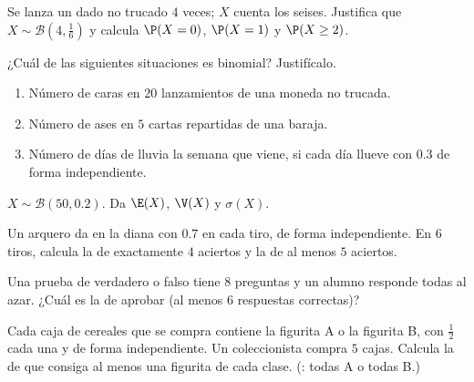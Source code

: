 \begin{exercise}[$\star$]\label{exo:g11:binom:2}
Se lanza un dado no trucado $4$ veces; $X$ cuenta los seises. Justifica
que $X \sim \mathcal B\left(4, \frac16\right)$ y calcula $\P(X = 0)$,
$\P(X = 1)$ y $\P(X \geq 2)$.
\end{exercise}

\begin{exercise}[$\star$]\label{exo:g11:binom:3}
¿Cuál de las siguientes situaciones es binomial? Justifícalo.
\begin{enumerate}
  \item Número de caras en $20$ lanzamientos de una moneda no trucada.
  \item Número de ases en $5$ cartas repartidas de una baraja.
  \item Número de días de lluvia la semana que viene, si cada día llueve
        con  $0.3$ de forma independiente.
\end{enumerate}
\end{exercise}

\begin{exercise}[$\star$]\label{exo:g11:binom:4}
$X \sim \mathcal B(50, 0.2)$. Da $\E(X)$, $\V(X)$ y $\sigma(X)$.
\end{exercise}

\begin{exercise}[$\star\star$]\label{exo:g11:binom:5}
Un arquero da en la diana con  $0.7$ en cada tiro, de forma
independiente. En $6$ tiros, calcula la  de exactamente $4$
aciertos y la de al menos $5$ aciertos.
\end{exercise}

\begin{exercise}[$\star\star$]\label{exo:g11:binom:6}
Una prueba de verdadero o falso tiene $8$ preguntas y un alumno responde
todas al azar. ¿Cuál es la  de aprobar (al menos $6$
respuestas correctas)?
\end{exercise}

\begin{exercise}[$\star\star$]\label{exo:g11:binom:7}
Cada caja de cereales que se compra contiene la figurita A o la figurita
B, con  $\frac12$ cada una y de forma independiente. Un
coleccionista compra $5$ cajas. Calcula la  de que consiga al
menos una figurita de cada clase. (: todas A o todas B.)
\end{exercise}

